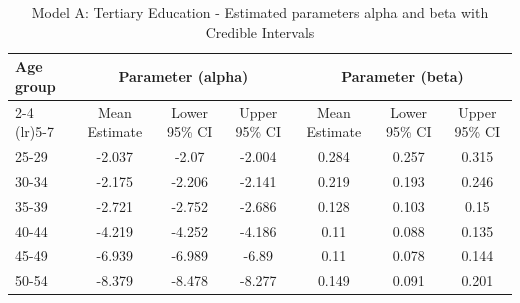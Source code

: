 \begin{landscape}
\begin{table}[htbp]
\centering
\caption{Model A: Tertiary Education - Estimated parameters alpha and beta  with Credible Intervals}
\label{tab:Fparameters_ab4}
\begin{tabular}{@{}lcccccc@{}}
\toprule
Age group & \multicolumn{3}{c}{Parameter (alpha)} & \multicolumn{3}{c}{Parameter (beta)} \\ 
\cmidrule(lr){2-4} \cmidrule(lr){5-7}
          & Mean Estimate & Lower 95\% CI & Upper 95\% CI & Mean Estimate & Lower 95\% CI & Upper 95\% CI \\ 
\midrule
25-29 & -2.037 & -2.07 & -2.004 & 0.284 & 0.257 & 0.315 \\
30-34 & -2.175 & -2.206 & -2.141 & 0.219 & 0.193 & 0.246 \\
35-39 & -2.721 & -2.752 & -2.686 & 0.128 & 0.103 & 0.15 \\
40-44 & -4.219 & -4.252 & -4.186 & 0.11 & 0.088 & 0.135 \\
45-49 & -6.939 & -6.989 & -6.89 & 0.11 & 0.078 & 0.144 \\
50-54 & -8.379 & -8.478 & -8.277 & 0.149 & 0.091 & 0.201 \\
\bottomrule
\end{tabular}
\end{table}
\end{landscape}